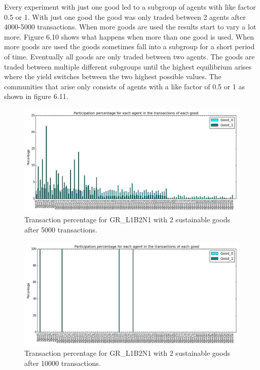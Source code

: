 \documentclass[twoside,openright]{uva-bachelor-thesis}
\begin{document}
Every experiment with just one good led to a subgroup of agents with like factor 0.5 or 1. With just one good the good was only traded between 2 agents after 4000-5000 transactions. When more goods are used the results start to vary a lot more. Figure 6.10 shows what happens when more than one good is used. When more goods are used the goods sometimes fall into a subgroup for a short period of time. Eventually all goods are only traded between two agents. The goods are traded between multiple different subgroups until the highest equilibrium arises where the yield switches between the two highest possible values. The communities that arise only consists of agents with a like factor of 0.5 or 1 as shown in figure 6.11. \\
\begin{figure}[h!]
\centering
\includegraphics[scale=0.4]{Simulation2_figures/GR_L1B2N1/Figure3_2goods_5k}
\caption{Transaction percentage for GR\_L1B2N1 with 2 sustainable goods after 5000 transactions.}
\end{figure}

\begin{figure}[h!]
\centering
\includegraphics[scale=0.4]{Simulation2_figures/GR_L1B2N1/Figure4_2goods_10k}
\caption{Transaction percentage for GR\_L1B2N1 with 2 sustainable goods after 10000 transactions.}
\end{figure}
\end{document}
